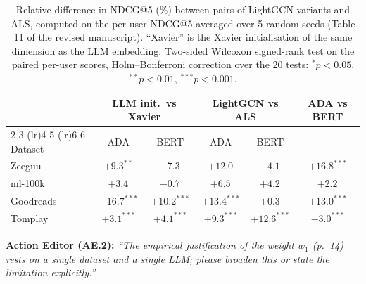 \documentclass[11pt,a4paper]{article}
\newcommand{\mm}[1]{#1}
\begin{document}
\begin{table}[!htbp]
\centering
\scriptsize
\color{maximecolor}
\caption{\mm{Relative difference in NDCG@5 (\%) between pairs of LightGCN variants and ALS, computed on the per-user NDCG@5 averaged over 5 random seeds (Table 11 of the revised manuscript). ``Xavier'' is the Xavier initialisation of the same dimension as the LLM embedding. Two-sided Wilcoxon signed-rank test on the paired per-user scores, Holm--Bonferroni correction over the 20 tests: $^{*}p<0.05$, $^{**}p<0.01$, $^{***}p<0.001$.}}
\label{tab:rebuttal_rs_tests}
\begin{tabular}{lccccc}
\toprule
 & \multicolumn{2}{c}{LLM init.\ vs Xavier} & \multicolumn{2}{c}{LightGCN vs ALS} & ADA vs BERT \\
\cmidrule(lr){2-3} \cmidrule(lr){4-5} \cmidrule(lr){6-6}
Dataset & ADA & BERT & ADA & BERT & \\
\midrule
Zeeguu & $+9.3^{**}$ & $-7.3^{}$ & $+12.0^{}$ & $-4.1^{}$ & $+16.8^{***}$ \\
ml-100k & $+3.4^{}$ & $-0.7^{}$ & $+6.5^{}$ & $+4.2^{}$ & $+2.2^{}$ \\
Goodreads & $+16.7^{***}$ & $+10.2^{***}$ & $+13.4^{***}$ & $+0.3^{}$ & $+13.0^{***}$ \\
Tomplay & $+3.1^{***}$ & $+4.1^{***}$ & $+9.3^{***}$ & $+12.6^{***}$ & $-3.0^{***}$ \\
\bottomrule
\end{tabular}
\end{table}

\begin{reviewbox}
\textbf{Action Editor (AE.2):} \textit{``The empirical justification of the weight $w_1$ (p.\ 14) rests on a single dataset and a single LLM; please broaden this or state the limitation explicitly.''}
\end{reviewbox}
\end{document}
